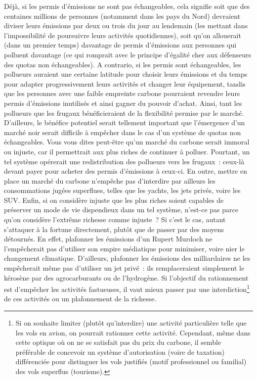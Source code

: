 \documentclass[a5paper,french]{memoir}
\begin{document}
Déjà, si les permis d'émissions ne sont pas échangeables, cela signifie soit que des centaines millions de personnes (notamment dans les pays du Nord) devraient diviser leurs émissions par deux ou trois du jour au lendemain (les mettant dans l'impossibilité de poursuivre leurs activités quotidiennes), soit qu'on allouerait (dans un premier temps) davantage de permis d'émissions aux personnes qui polluent davantage (ce qui romprait avec le principe d'égalité cher aux défenseurs des quotas non échangeables). A contrario, si les permis sont échangeables, les pollueurs auraient une certaine latitude pour choisir leurs émissions et du temps pour adapter progressivement leurs activités et changer leur équipement, tandis que les personnes avec une faible empreinte carbone pourraient revendre leurs permis d'émissions inutilisés et ainsi gagner du pouvoir d'achat. Ainsi, tant les pollueurs que les frugaux bénéficieraient de la flexibilité permise par le marché. D'ailleurs, le bénéfice potentiel serait tellement important que l'émergence d'un marché noir serait difficile à empêcher dans le cas d'un système de quotas non échangeables. Vous vous dites peut-être qu'un marché du carbone serait immoral ou injuste, car il permettrait aux plus riches de continuer à polluer. Pourtant, un tel système opérerait une redistribution des pollueurs vers les frugaux~: ceux-là devant payer pour acheter des permis d'émissions à ceux-ci. En outre, mettre en place un marché du carbone n'empêche pas d'interdire par ailleurs les consommations jugées superflues, telles que les yachts, les jets privés, voire les SUV. Enfin, si on considère injuste que les plus riches soient capables de préserver un mode de vie dispendieux dans un tel système, n'est-ce pas parce qu'on considère l'extrême richesse comme injuste~? Si c'est le cas, autant s'attaquer à la fortune directement, plutôt que de passer par des moyens détournés. En effet, plafonner les émissions d'un Rupert Murdoch ne l'empêcherait pas d'utiliser son empire médiatique pour minimiser, voire nier le changement climatique. D'ailleurs, plafonner les émissions des milliardaires ne les empêcherait même pas d'utiliser un jet privé~: ils remplaceraient simplement le kérosène par des agrocarburants ou de l'hydrogène. Si l'objectif du rationnement est d'empêcher les activités fastueuses, %
il vaut mieux passer par une interdiction\footnote{Si on souhaite limiter (plutôt qu'interdire) une activité particulière telle que les vols en avion, on pourrait rationner cette activité. Cependant, même dans cette optique où on ne se satisfait pas du prix du carbone, il semble préférable de concevoir un système d'autorisation (voire de taxation) différenciée pour distinguer les vols justifiés (motif professionnel ou familial) des vols superflus (tourisme). } de ces activités ou un plafonnement de la richesse.  %
\end{document}
